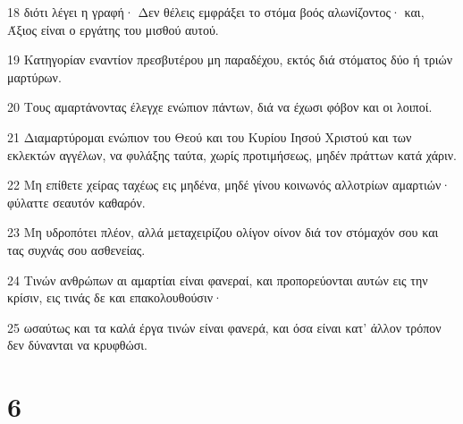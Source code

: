 \par 18 διότι λέγει η γραφή· Δεν θέλεις εμφράξει το στόμα βοός αλωνίζοντος· και, Άξιος είναι ο εργάτης του μισθού αυτού.
\par 19 Κατηγορίαν εναντίον πρεσβυτέρου μη παραδέχου, εκτός διά στόματος δύο ή τριών μαρτύρων.
\par 20 Τους αμαρτάνοντας έλεγχε ενώπιον πάντων, διά να έχωσι φόβον και οι λοιποί.
\par 21 Διαμαρτύρομαι ενώπιον του Θεού και του Κυρίου Ιησού Χριστού και των εκλεκτών αγγέλων, να φυλάξης ταύτα, χωρίς προτιμήσεως, μηδέν πράττων κατά χάριν.
\par 22 Μη επίθετε χείρας ταχέως εις μηδένα, μηδέ γίνου κοινωνός αλλοτρίων αμαρτιών· φύλαττε σεαυτόν καθαρόν.
\par 23 Μη υδροπότει πλέον, αλλά μεταχειρίζου ολίγον οίνον διά τον στόμαχόν σου και τας συχνάς σου ασθενείας.
\par 24 Τινών ανθρώπων αι αμαρτίαι είναι φανεραί, και προπορεύονται αυτών εις την κρίσιν, εις τινάς δε και επακολουθούσιν·
\par 25 ωσαύτως και τα καλά έργα τινών είναι φανερά, και όσα είναι κατ' άλλον τρόπον δεν δύνανται να κρυφθώσι.

\chapter{6}

